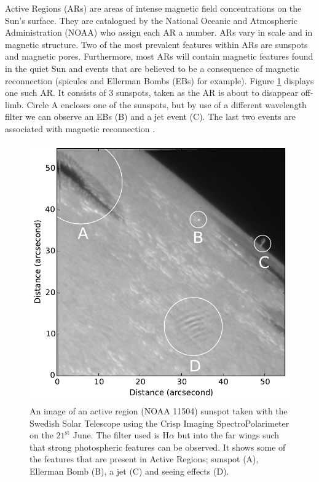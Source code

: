     Active Regions (ARs) are areas of intense magnetic field concentrations on the Sun's surface.
    They are catalogued by the National Oceanic and Atmospheric Administration (NOAA) who  assign each AR a number.
    ARs vary in scale and in magnetic structure.
    Two of the most prevalent features within ARs are sunspots and magnetic pores.
    Furthermore, most ARs will contain magnetic features found in the quiet Sun and events that are believed to be a consequence of magnetic reconnection (spicules and Ellerman Bombs (EBs) for example). 
    Figure \ref{fig:AR} displays one such AR. 
    It consists of $3$ sunspots, taken as the AR is about to disappear off-limb.
    Circle A encloses one of the sunspots, but by use of a  different wavelength filter we can observe an EBs (B) and a jet event (C).
    The last two events are associated with magnetic reconnection \citep{2013SoPh..283..307N,2013A&A...560A..31N,2013ApJ...779..125N,2015ApJ...798...19N}.
     
    \begin{figure}
        \centering
        \includegraphics[width=\textwidth]{AR.pdf}
        \caption{
                 An image of an active region (NOAA 11504) sunspot taken with the Swedish Solar Telescope using the Crisp Imaging SpectroPolarimeter on the $21^{\mathrm{st}}$ June. 
                 The filter used is H$\alpha$ but into the far wings such that strong photospheric features can be observed.
                 It shows some of the features that are present in Active Regions; sunspot (A), Ellerman Bomb (B), a jet (C) and seeing effects (D).
              }
        \label{fig:AR}
     \end{figure}    

